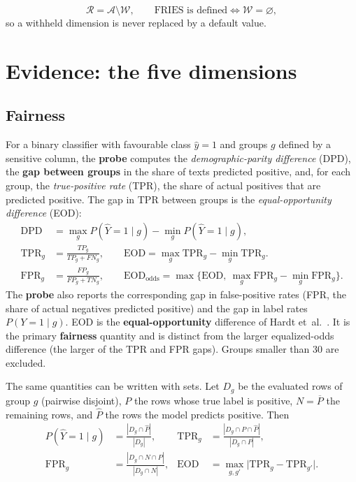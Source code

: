 \begin{equation}
\mathcal R=\mathcal A\setminus\mathcal W,\qquad \text{FRIES is defined}\iff \mathcal W=\varnothing,\label{eq:rated}
\end{equation}
so a withheld dimension is never replaced by a default value.

\section{Evidence: the five dimensions}
\subsection{Fairness}\label{sec:fair}
For a binary classifier with favourable class $\hat y=1$ and groups $g$ defined by a sensitive column, the \textbf{probe} computes the \emph{demographic-parity difference} (DPD), the \textbf{gap between groups} in the share of texts predicted positive, and, for each group, the \emph{true-positive rate} (TPR), the share of actual positives that are predicted positive. The gap in TPR between groups is the \emph{equal-opportunity difference} (EOD):
\begin{align}
\mathrm{DPD} &= \max_g P(\hat Y{=}1\mid g)-\min_g P(\hat Y{=}1\mid g),\\
\mathrm{TPR}_g &= \tfrac{TP_g}{TP_g+FN_g}, \qquad \mathrm{EOD} = \max_g \mathrm{TPR}_g-\min_g \mathrm{TPR}_g.\label{eq:eod}\\
\mathrm{FPR}_g &= \tfrac{FP_g}{FP_g+TN_g}, \qquad \mathrm{EOD}_{\mathrm{odds}} = \max\bigl\{\mathrm{EOD},\ \max_g \mathrm{FPR}_g-\min_g \mathrm{FPR}_g\bigr\}.\label{eq:odds}
\end{align}
The \textbf{probe} also reports the corresponding gap in false-positive rates (FPR, the share of actual negatives predicted positive) and the gap in label rates $P(Y{=}1\mid g)$. EOD is the \textbf{equal-opportunity} difference of Hardt et~al.\ \cite{hardt2016}. It is the primary \textbf{fairness} quantity and is distinct from the larger equalized-odds difference (the larger of the TPR and FPR gaps). Groups smaller than 30 are excluded.

The same quantities can be written with sets. Let $D_g$ be the evaluated rows of group $g$ (pairwise disjoint), $P$ the rows whose true label is positive, $N=\overline{P}$ the remaining rows, and $\hat P$ the rows the model predicts positive. Then
\begin{align}
P(\hat Y{=}1\mid g) &= \frac{|D_g\cap \hat P|}{|D_g|}, &
\mathrm{TPR}_g &= \frac{|D_g\cap P\cap \hat P|}{|D_g\cap P|},\\
\mathrm{FPR}_g &= \frac{|D_g\cap N\cap \hat P|}{|D_g\cap N|}, &
\mathrm{EOD} &= \max_{g,g'}\bigl|\mathrm{TPR}_g-\mathrm{TPR}_{g'}\bigr|.\label{eq:fairset}
\end{align}

